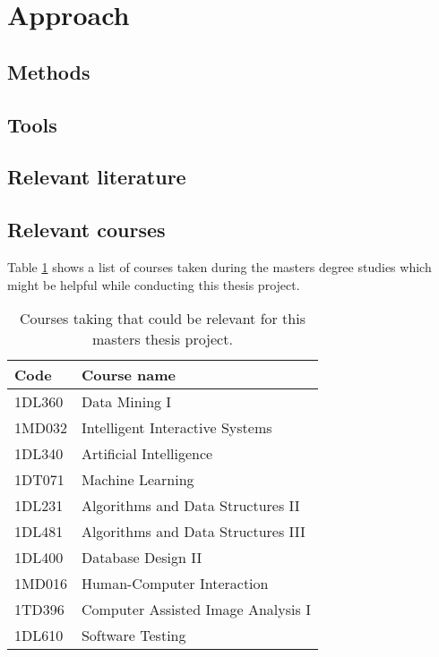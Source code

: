 \section{Approach}


\subsection{Methods}

\subsection{Tools}

\subsection{Relevant literature}

\subsection{Relevant courses}
Table \ref{approach:relevant_courses} shows a list of courses taken during the masters degree studies which might be helpful while conducting this thesis project.

\begin{table}[h]
  \centering
  \begin{tabularx}{\textwidth}{|l|X|}
    \hline
    Code & Course name \\
    \hline
    1DL360 & Data Mining I \\
    1MD032 & Intelligent Interactive Systems \\
    1DL340 & Artificial Intelligence \\
    1DT071 & Machine Learning \\
    1DL231 & Algorithms and Data Structures II \\
    1DL481 & Algorithms and Data Structures III \\
    1DL400 & Database Design II \\
    1MD016 & Human-Computer Interaction \\
    1TD396 & Computer Assisted Image Analysis I \\
    1DL610 & Software Testing \\
    \hline
  \end{tabularx}
  \caption{Courses taking that could be relevant for this masters thesis project.}
  \label{approach:relevant_courses}
\end{table}